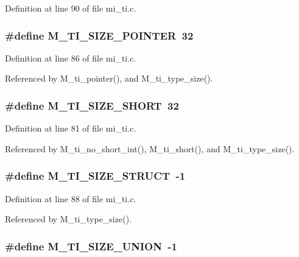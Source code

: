 Definition at line 90 of file mi\_\-ti.c.
\subsubsection{\setlength{\rightskip}{0pt plus 5cm}\#define M\_\-TI\_\-SIZE\_\-POINTER~32}\label{mi__ti_8c_e8f7cf7c9b4bb52ee37fbce364692a4f}




Definition at line 86 of file mi\_\-ti.c.

Referenced by M\_\-ti\_\-pointer(), and M\_\-ti\_\-type\_\-size().
\subsubsection{\setlength{\rightskip}{0pt plus 5cm}\#define M\_\-TI\_\-SIZE\_\-SHORT~32}\label{mi__ti_8c_f7874a766f97a354df11e266fc5a7800}




Definition at line 81 of file mi\_\-ti.c.

Referenced by M\_\-ti\_\-no\_\-short\_\-int(), M\_\-ti\_\-short(), and M\_\-ti\_\-type\_\-size().
\subsubsection{\setlength{\rightskip}{0pt plus 5cm}\#define M\_\-TI\_\-SIZE\_\-STRUCT~-1}\label{mi__ti_8c_bc0eccf6a162a156eb1e3f9c069184bf}




Definition at line 88 of file mi\_\-ti.c.

Referenced by M\_\-ti\_\-type\_\-size().
\subsubsection{\setlength{\rightskip}{0pt plus 5cm}\#define M\_\-TI\_\-SIZE\_\-UNION~-1}\label{mi__ti_8c_77e87b41964312f9c9aa20edb458bdc0}




